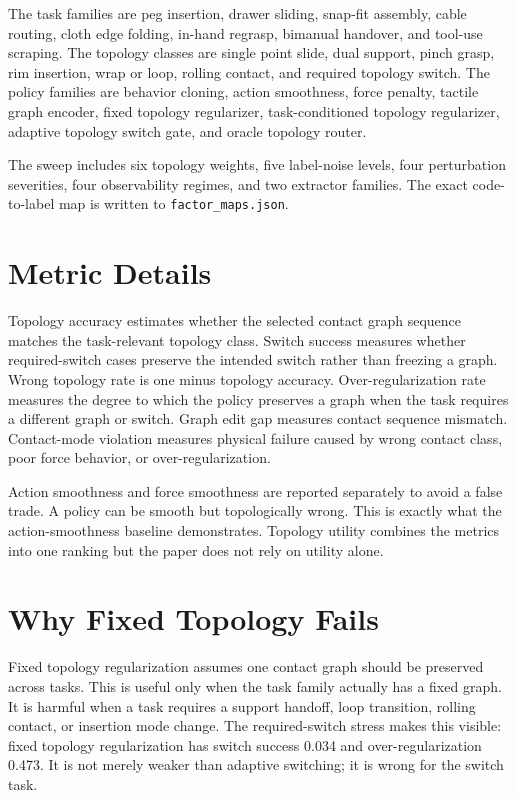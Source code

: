 \documentclass{article}
\begin{document}
The task families are peg insertion, drawer sliding, snap-fit assembly, cable routing, cloth edge folding, in-hand regrasp, bimanual handover, and tool-use scraping. The topology classes are single point slide, dual support, pinch grasp, rim insertion, wrap or loop, rolling contact, and required topology switch. The policy families are behavior cloning, action smoothness, force penalty, tactile graph encoder, fixed topology regularizer, task-conditioned topology regularizer, adaptive topology switch gate, and oracle topology router.

The sweep includes six topology weights, five label-noise levels, four perturbation severities, four observability regimes, and two extractor families. The exact code-to-label map is written to \texttt{factor\_maps.json}.

\section{Metric Details}

Topology accuracy estimates whether the selected contact graph sequence matches the task-relevant topology class. Switch success measures whether required-switch cases preserve the intended switch rather than freezing a graph. Wrong topology rate is one minus topology accuracy. Over-regularization rate measures the degree to which the policy preserves a graph when the task requires a different graph or switch. Graph edit gap measures contact sequence mismatch. Contact-mode violation measures physical failure caused by wrong contact class, poor force behavior, or over-regularization.

Action smoothness and force smoothness are reported separately to avoid a false trade. A policy can be smooth but topologically wrong. This is exactly what the action-smoothness baseline demonstrates. Topology utility combines the metrics into one ranking but the paper does not rely on utility alone.

\section{Why Fixed Topology Fails}

Fixed topology regularization assumes one contact graph should be preserved across tasks. This is useful only when the task family actually has a fixed graph. It is harmful when a task requires a support handoff, loop transition, rolling contact, or insertion mode change. The required-switch stress makes this visible: fixed topology regularization has switch success 0.034 and over-regularization 0.473. It is not merely weaker than adaptive switching; it is wrong for the switch task.
\end{document}
